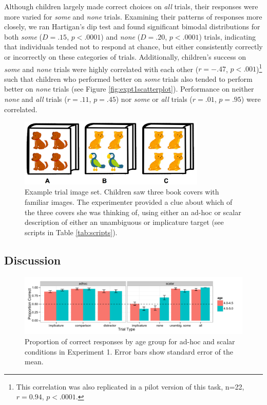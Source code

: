 \documentclass[10pt,letterpaper]{article}
\begin{document}
Although children largely made correct choices on \emph{all} trials, their responses were more varied for \emph{some} and \emph{none} trials.  Examining their patterns of responses more closely, we ran Hartigan's dip test and found significant bimodal distributions for both \emph{some} ($D=.15$, $p<.0001$) and \emph{none} ($D=.20$, $p<.0001$) trials, indicating that individuals tended not to respond at chance, but either consistently correctly or incorrectly on these categories of trials. Additionally, children's success on \emph{some} and \emph{none} trials were highly correlated with each other ($r=-.47$, $p<.001$)\footnote{This correlation was also replicated in a pilot version of this task, n=22, $r=0.94$, $p<.0001$.} such that children who performed better on \emph{some} trials also tended to perform better on \emph{none} trials (see Figure \ref{fig:expt1scatterplot}). Performance on neither \emph{none} and \emph{all} trials ($r=.11$, $p=.45$) nor \emph{some} or \emph{all} trials ($r=.01$, $p=.95$) were correlated.

 \begin{figure}[h] 
  \begin{center} 
    \includegraphics[width=3.5in]{figures/implicatures_demo_letters.png} 
    \caption{\label{fig:demo} Example trial image set. Children saw three book covers with familiar images. The experimenter provided a clue about which of the three covers she was thinking of, using either an ad-hoc or scalar description of either an unambiguous or implicature target (see scripts in Table \ref{tab:scripts}).}
    \end{center} 
\end{figure}

\subsection{Discussion}

\begin{figure}[t] 
  \begin{center} 
    \includegraphics[width=7.5in]{figures/implicatures_adhocScalar_long.pdf} 
    \caption{\label{fig:expt1} Proportion of correct responses by age group for ad-hoc and scalar conditions in Experiment 1. Error bars show standard error of the mean.}
    \end{center} 
\end{figure}
\end{document}
